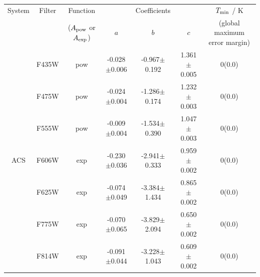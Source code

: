\documentclass[12pt, a4paper]{report}
\begin{document}
\begin{table}
\begin{center}
\begin{tabular}{ccccccc}
\hline
System & Filter &  Function & & Coefficients & & $T_{\textnormal{min}}$ / K \\
 & & ($A_{\textnormal{pow}}$ or $A_{\textnormal{exp}}$) & $a$ & $b$ & $c$ & (global maximum error margin) \\
\hline

& F435W & pow & -0.028$\pm$0.006 & -0.967$\pm$0.192 & 1.361$\pm$0.005 & 0(0.0) \\
& F475W & pow & -0.024$\pm$0.004 & -1.286$\pm$0.174 & 1.232$\pm$0.003 & 0(0.0) \\
& F555W & pow & -0.009$\pm$0.004 & -1.534$\pm$0.390 & 1.047$\pm$0.003 & 0(0.0) \\
ACS & F606W & exp & -0.230$\pm$0.036 & -2.941$\pm$0.333 & 0.959$\pm$0.002 & 0(0.0) \\
& F625W & exp & -0.074$\pm$0.049 & -3.384$\pm$1.434 & 0.865$\pm$0.002 & 0(0.0) \\
& F775W & exp & -0.070$\pm$0.065 & -3.829$\pm$2.094 & 0.650$\pm$0.002 & 0(0.0) \\
& F814W & exp & -0.091$\pm$0.044 & -3.228$\pm$1.043 & 0.609$\pm$0.002 & 0(0.0) \\ \hline



\end{tabular}
\end{center}
\end{table}
\end{document}
